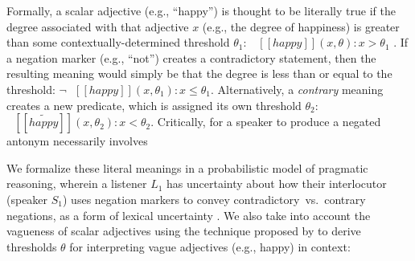 \documentclass[floatsintext,doc]{apa6}
\begin{document}

Formally, a scalar adjective (e.g., \enquote{happy}) is thought to be literally true if the degree associated with that adjective \(x\) (e.g., the degree of happiness) is greater than some contextually-determined threshold \(\theta_1\): \(\mbox{ $[\![ happy ]\!]$}(x, \theta): x > \theta_1\) \cite{Kennedy2007}.
If a negation marker (e.g., \enquote{not}) creates a contradictory statement, then the resulting meaning would simply be that the degree is less than or equal to the threshold: \(\neg \mbox{ $[\![ happy ]\!]$}(x, \theta_1): x \leq \theta_1\).
Alternatively, a \emph{contrary} meaning creates a new predicate, which is assigned its own threshold \(\theta_2\): \(\mbox{ $[\![ \tilde{happy} ]\!]$}(x, \theta_2): x < \theta_2\).
Critically, for a speaker to produce a negated antonym necessarily involves 

We formalize these literal meanings in a probabilistic model of pragmatic reasoning, wherein a listener $L_1$ has uncertainty about how their interlocutor (speaker $S_1$) uses negation markers to convey contradictory~vs.~contrary negations, as a form of lexical uncertainty \cite{Bergen2016}.
We also take into account the vagueness of scalar adjectives using the technique proposed by  to derive thresholds \(\theta\) for interpreting vague adjectives (e.g., happy) in context:

\end{document}
